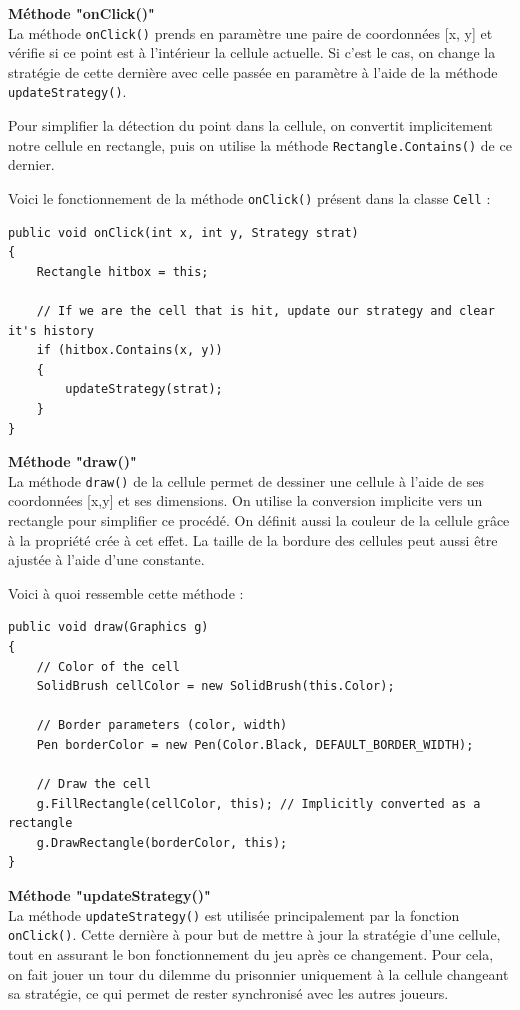 \documentclass[a4paper, french]{article}
\begin{document}
\pagebreak
\textbf{Méthode "onClick()"}\\
La méthode \texttt{onClick()} prends en paramètre une paire de coordonnées [x, y] et vérifie si ce point est à l'intérieur la cellule actuelle. Si c'est le cas, on change la stratégie de cette dernière avec celle passée en paramètre à l'aide de la méthode \texttt{updateStrategy()}. 

Pour simplifier la détection du point dans la cellule, on convertit implicitement notre cellule en rectangle, puis on utilise la méthode \texttt{Rectangle.Contains()} de ce dernier.

Voici le fonctionnement de la méthode \texttt{onClick()} présent dans la classe \texttt{Cell} :
\begin{lstlisting}
public void onClick(int x, int y, Strategy strat)
{
    Rectangle hitbox = this;

    // If we are the cell that is hit, update our strategy and clear it's history
    if (hitbox.Contains(x, y))
    {
        updateStrategy(strat);
    }
}
\end{lstlisting}

\textbf{Méthode "draw()"}\\
La méthode \texttt{draw()} de la cellule permet de dessiner une cellule à l'aide de ses coordonnées [x,y] et ses dimensions. On utilise la conversion implicite vers un rectangle pour simplifier ce procédé. On définit aussi la couleur de la cellule grâce à la propriété crée à cet effet. La taille de la bordure des cellules peut aussi être ajustée à l'aide d'une constante.

Voici à quoi ressemble cette méthode :
\begin{lstlisting}
public void draw(Graphics g)
{
    // Color of the cell
    SolidBrush cellColor = new SolidBrush(this.Color);
    
    // Border parameters (color, width)
    Pen borderColor = new Pen(Color.Black, DEFAULT_BORDER_WIDTH);
    
    // Draw the cell
    g.FillRectangle(cellColor, this); // Implicitly converted as a rectangle
    g.DrawRectangle(borderColor, this);
}
\end{lstlisting}

\textbf{Méthode "updateStrategy()"}\\
La méthode \texttt{updateStrategy()} est utilisée principalement par la fonction \texttt{onClick()}. Cette dernière à pour but de mettre à jour la stratégie d'une cellule, tout en assurant le bon fonctionnement du jeu après ce changement. Pour cela, on fait jouer un tour du dilemme du prisonnier uniquement à la cellule changeant sa stratégie, ce qui permet de rester synchronisé avec les autres joueurs.
\end{document}
